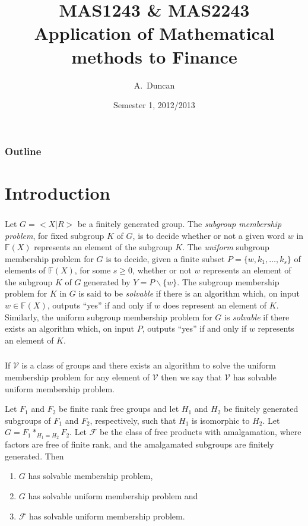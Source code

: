 \documentclass[envcountsect,compress]{beamer}
\title[MAS1243]
{
  MAS1243 \& MAS2243\\
  Application of Mathematical methods to Finance
}
\author{A.~Duncan}
\institute[NCL]
{
  Newcastle University\\
  School of Mathematics and Statistics
}
\date[2012/2013]
{
  Semester 1, 2012/2013
}
\theoremstyle{definition}
\numberwithin{equation}{section}
\newcommand{\be}{\begin{enumerate}[<+->]}
\newcommand{\ee}{\end{enumerate}}
\newcommand{\FF}{\mathbb{F}}
\newcommand{\cF}{{\mathcal{F}}}
\newcommand{\cV}{{\mathcal{V}}}
\begin{document}
\begin{frame}
\titlepage
\end{frame}

\begin{frame}
  \frametitle{Outline}
  \tableofcontents[pausesections]
\end{frame}
\section{Introduction}

\begin{frame}
  \frametitle{}
Let $G = <X|R>$ be a finitely generated group.
The \emph{subgroup  membership problem}, for  fixed subgroup $K$ of $G$,
is to decide whether or not a given  word $w$ in $\FF(X)$ represents an element of  the subgroup $K$.
The \emph{uniform} subgroup membership problem for $G$ is to decide,
given a finite subset $P=\{w,k_1,\ldots ,k_s\}$ of elements of $\FF(X)$,
for some $s\ge 0$,
whether or not $w$ represents an element of  the subgroup $K$ of $G$
generated by $Y=P\backslash\{w\}$.
The  subgroup membership problem for $K$ in $G$ is said to be
\emph{solvable} if there is an algorithm which, on input $w\in \FF(X)$,
outputs ``yes'' if and only if $w$ does represent an element of $K$.
Similarly, the uniform subgroup membership problem for $G$ is \emph{solvable}
if there exists an algorithm which, on input $P$, outputs ``yes'' if
and only if $w$ represents an element of $K$.
\end{frame}
\begin{frame}
  \frametitle{}

If $\cV$ is a class of groups and there exists an algorithm to
solve the uniform membership %
 problem for any element of $\cV$ then
we say that $\cV$ has solvable uniform  %
 membership problem.

\begin{theorem}\label{thm:membership}
Let $F_1$ and $F_2$ be finite rank free groups and let $H_1$ and $H_2$
be finitely generated subgroups of $F_1$ and $F_2$, respectively, such
that $H_1$ is isomorphic to $H_2$. Let $G=F_1 \ast_{H_1=H_2} F_2$.
Let $\cF$ be the class of free products with amalgamation, where
factors are free of finite rank, and the amalgamated subgroups are
finitely generated.
Then
\be
\item\label{it:membership}
$G$ has solvable membership problem,
\item \label{it:uni-membership}
$G$ has solvable uniform  membership problem and
\item\label{it:class-uni-membership}
$\cF$ has solvable uniform  membership problem.
\ee
\end{theorem}
\end{frame}
\end{document}
